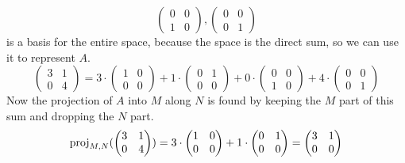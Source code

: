 \begin{example}
\begin{equation*}
{    \begin{pmatrix}
      0  &0  \\
      1  &0      
    \end{pmatrix},
    \begin{pmatrix}
      0  &0  \\
      0  &1
    \end{pmatrix}
                   }
\end{equation*}
is a basis for the entire space, because the space is the direct sum, 
so we can use it to represent $A$.
\begin{equation*}
  \begin{pmatrix}
          3  &1  \\
          0  &4
  \end{pmatrix}=
    3\cdot\begin{pmatrix}
      1  &0  \\
      0  &0      
    \end{pmatrix}
    +1\cdot\begin{pmatrix}
      0  &1  \\
      0  &0
    \end{pmatrix}
    +0\cdot\begin{pmatrix}
      0  &0  \\
      1  &0      
    \end{pmatrix}
    +4\cdot\begin{pmatrix}
      0  &0  \\
      0  &1
    \end{pmatrix}
\end{equation*}
Now the projection of $A$ into $M$ along $N$ is found by keeping the 
$M$ part of this sum and dropping the $N$ part.
\begin{equation*}
  \proj{\begin{pmatrix}
          3  &1  \\
          0  &4
  \end{pmatrix} }{M,N}
  =
    3\cdot\begin{pmatrix}
      1  &0  \\
      0  &0      
    \end{pmatrix}
    +1\cdot\begin{pmatrix}
      0  &1  \\
      0  &0
    \end{pmatrix}
    =\begin{pmatrix}
      3  &1  \\
      0  &0      
    \end{pmatrix}
\end{equation*}
\end{example}

